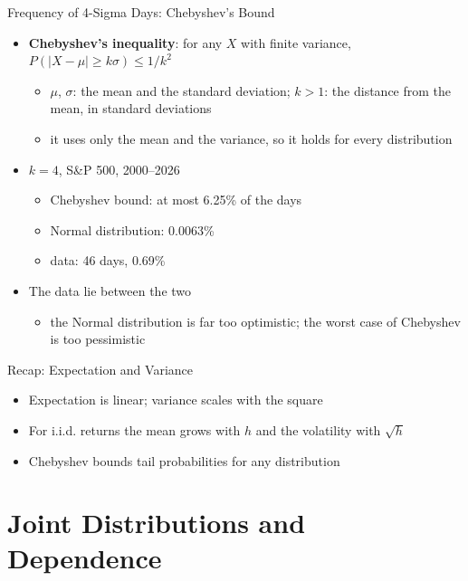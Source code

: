 \begin{frame}{Frequency of 4-Sigma Days: Chebyshev's Bound}
\itemsize{\small}
\begin{itemize}
    \item \textbf{Chebyshev's inequality}: for any $X$ with finite variance, $P(|X - \mu| \ge k\sigma) \le 1/k^2$
    \begin{itemize}
        \item $\mu$, $\sigma$: the mean and the standard deviation; $k > 1$: the distance from the mean, in standard deviations
        \item it uses only the mean and the variance, so it holds for every distribution
    \end{itemize}
    \item $k = 4$, S\&P 500, 2000--2026
    \begin{itemize}
        \item Chebyshev bound: at most 6.25\% of the days
        \item Normal distribution: 0.0063\%
        \item data: 46 days, 0.69\%
    \end{itemize}
    \item The data lie between the two
    \begin{itemize}
        \item the Normal distribution is far too optimistic; the worst case of Chebyshev is too pessimistic
    \end{itemize}
\end{itemize}
\end{frame}

\begin{frame}{Recap: Expectation and Variance}
\itemsize{\small}
\begin{itemize}
    \item Expectation is linear; variance scales with the square
    \item For i.i.d. returns the mean grows with $h$ and the volatility with $\sqrt{h}$
    \item Chebyshev bounds tail probabilities for any distribution
\end{itemize}
\end{frame}


\section{Joint Distributions and Dependence}

